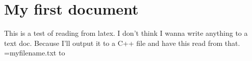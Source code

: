 \documentclass[12pt]{article}
\begin{document}
\section*{My first document}

\begingroup
\obeylines
%
\endgroup%

This is a test of reading from latex.
I don't think I wanna write anything to a text doc.
Because I'll output it to a C++ file and have this read from that.\\

\newread\file
\openin\file=myfilename.txt
\loop\unless\ifeof\file
    \read\file to\fileline %

\fileline

\repeat
\closein\file
\end{document}
